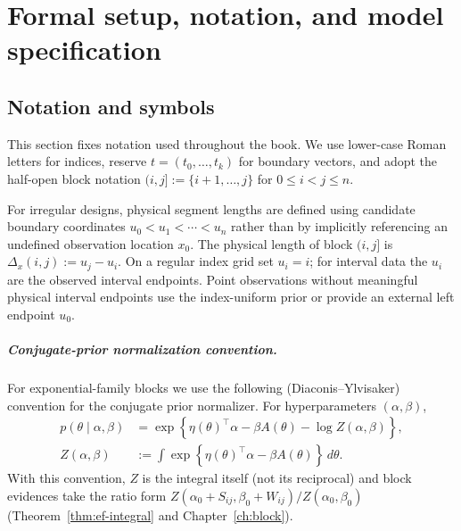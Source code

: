 \chapter{Formal setup, notation, and model specification}
\label{ch:formal}

\section{Notation and symbols}
\label{sec:notation}

This section fixes notation used throughout the book. We use lower-case Roman letters for
indices, reserve $t=(t_0,\dots,t_k)$ for boundary vectors, and adopt the half-open block notation
$(i,j]:=\{i+1,\dots,j\}$ for $0\le i<j\le n$.

For irregular designs, physical segment lengths are defined using candidate boundary coordinates
$u_0<u_1<\cdots<u_n$ rather than by implicitly referencing an undefined observation location
$x_0$. The physical length of block $(i,j]$ is
$\Delta_x(i,j):=u_j-u_i$. On a regular index grid set $u_i=i$; for interval data the
$u_i$ are the observed interval endpoints. Point observations without meaningful physical interval
endpoints use the index-uniform prior or provide an external left endpoint $u_0$.

\paragraph{Conjugate-prior normalization convention.}
For exponential-family blocks we use the following (Diaconis--Ylvisaker) convention for the
conjugate prior normalizer. For hyperparameters $(\alpha,\beta)$,
\begin{equation}
\begin{aligned}
p(\theta\mid \alpha,\beta)
  &= \exp\!\left\{\eta(\theta)^\top \alpha-\beta A(\theta)-\log Z(\alpha,\beta)\right\},\\
Z(\alpha,\beta)
  &:= \int \exp\!\left\{\eta(\theta)^\top \alpha-\beta A(\theta)\right\}\,d\theta.
\end{aligned}
\label{eq:Zconvention}
\end{equation}
With this convention, $Z$ is the integral itself (not its reciprocal) and block evidences take
the ratio form $Z(\alpha_0+S_{ij},\beta_0+W_{ij})/Z(\alpha_0,\beta_0)$ (Theorem~\ref{thm:ef-integral}
and Chapter~\ref{ch:block}).

